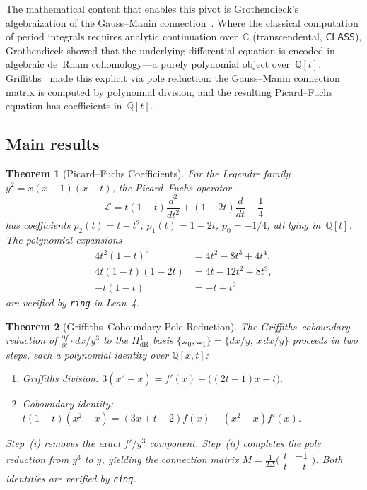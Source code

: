 \documentclass[11pt]{article}
\theoremstyle{plain}
\newtheorem{theorem}{Theorem}[section]
\theoremstyle{definition}
\theoremstyle{remark}
\newcommand{\Q}{\mathbb{Q}}
\newcommand{\C}{\mathbb{C}}
\newcommand{\calL}{\mathcal{L}}
\newcommand{\CLASS}{\mathsf{CLASS}}
\newcommand{\HdR}{H^1_{\mathrm{dR}}}
\begin{document}
The mathematical content that enables this pivot is
Grothendieck's algebraization of the Gauss--Manin
connection~\cite{Grothendieck1966,KatzOda1968}.  Where the
classical computation of period integrals requires analytic
continuation over~$\C$ (transcendental, $\CLASS$), Grothendieck
showed that the underlying differential equation is encoded in
algebraic de~Rham cohomology---a purely polynomial object over~$\Q[t]$.
Griffiths~\cite{Griffiths1969} made this explicit via pole
reduction: the Gauss--Manin connection matrix is computed by
polynomial division, and the resulting Picard--Fuchs equation has
coefficients in~$\Q[t]$.

\subsection{Main results}

\begin{theorem}[Picard--Fuchs Coefficients]\label{thm:A}
For the Legendre family $y^2 = x(x-1)(x-t)$, the
Picard--Fuchs operator
\[
  \calL = t(1-t)\frac{d^2}{dt^2} + (1-2t)\frac{d}{dt} - \frac{1}{4}
\]
has coefficients $p_2(t) = t - t^2$, $p_1(t) = 1 - 2t$,
$p_0 = -1/4$, all lying in~$\Q[t]$.  The polynomial expansions
\begin{align*}
  4t^2(1-t)^2 &= 4t^2 - 8t^3 + 4t^4, \\
  4t(1-t)(1-2t) &= 4t - 12t^2 + 8t^3, \\
  -t(1-t) &= -t + t^2
\end{align*}
are verified by \texttt{ring} in Lean~4.
\end{theorem}

\begin{theorem}[Griffiths--Coboundary Pole Reduction]\label{thm:B}
The Griffiths--coboundary reduction of $\frac{\partial f}{\partial t} \cdot dx/y^3$
to the $\HdR$ basis $\{\omega_0, \omega_1\} = \{dx/y, \, x\,dx/y\}$
proceeds in two steps, each a polynomial identity over $\Q[x,t]$:
\begin{enumerate}[nosep,label=(\roman*)]
\item \emph{Griffiths division:}
  $3(x^2 - x) = f'(x) + \bigl((2t-1)x - t\bigr)$.
\item \emph{Coboundary identity:}
  $t(1-t)(x^2-x) = (3x+t-2) f(x) - (x^2-x) f'(x)$.
\end{enumerate}
Step~(i) removes the exact $f'/y^3$ component.
Step~(ii) completes the pole reduction from $y^3$ to $y$,
yielding the connection matrix
$M = \frac{1}{2\Delta}\bigl(\begin{smallmatrix}t & -1\\t & -t\end{smallmatrix}\bigr)$.
Both identities are verified by \texttt{ring}.
\end{theorem}
\end{document}
